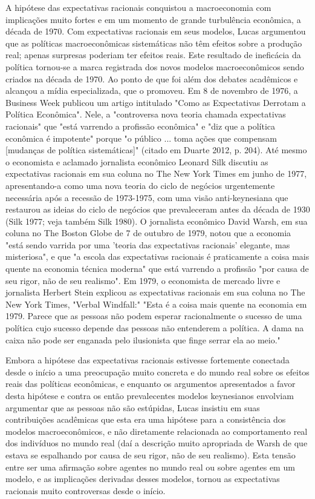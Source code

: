 \documentclass[a4paper,12pt]{article}[abntex2]
\begin{document}
A hipótese das expectativas racionais conquistou a macroeconomia com implicações muito fortes e em um momento de grande turbulência econômica, a década de 1970. Com expectativas racionais em seus modelos, Lucas argumentou que as políticas macroeconômicas sistemáticas não têm efeitos sobre a produção real; apenas surpresas poderiam ter efeitos reais. Este resultado de ineficácia da política tornou-se a marca registrada dos novos modelos macroeconômicos sendo criados na década de 1970. Ao ponto de que foi além dos debates acadêmicos e alcançou a mídia especializada, que o promoveu. Em 8 de novembro de 1976, a Business Week publicou um artigo intitulado "Como as Expectativas Derrotam a Política Econômica". Nele, a "controversa nova teoria chamada expectativas racionais" que "está varrendo a profissão econômica" e "diz que a política econômica é impotente" porque "o público ... toma ações que compensam [mudanças de política sistemáticas]" (citado em Duarte 2012, p. 204). Até mesmo o economista e aclamado jornalista econômico Leonard Silk discutiu as expectativas racionais em sua coluna no The New York Times em junho de 1977, apresentando-a como uma nova teoria do ciclo de negócios urgentemente necessária após a recessão de 1973-1975, com uma visão anti-keynesiana que restaurou as ideias do ciclo de negócios que prevaleceram antes da década de 1930 (Silk 1977; veja também Silk 1980). O jornalista econômico David Warsh, em sua coluna no The Boston Globe de 7 de outubro de 1979, notou que a economia "está sendo varrida por uma 'teoria das expectativas racionais' elegante, mas misteriosa", e que "a escola das expectativas racionais é praticamente a coisa mais quente na economia técnica moderna" que está varrendo a profissão "por causa de seu rigor, não de seu realismo". Em 1979, o economista de mercado livre e jornalista Herbert Stein explicou as expectativas racionais em sua coluna no The New York Times, "Verbal Windfall:" "Esta é a coisa mais quente na economia em 1979. Parece que as pessoas não podem esperar racionalmente o sucesso de uma política cujo sucesso depende das pessoas não entenderem a política. A dama na caixa não pode ser enganada pelo ilusionista que finge serrar ela ao meio."

Embora a hipótese das expectativas racionais estivesse fortemente conectada desde o início a uma preocupação muito concreta e do mundo real sobre os efeitos reais das políticas econômicas, e enquanto os argumentos apresentados a favor desta hipótese e contra os então prevalecentes modelos keynesianos envolviam argumentar que as pessoas não são estúpidas, Lucas insistiu em suas contribuições acadêmicas que esta era uma hipótese para a consistência dos modelos macroeconômicos, e não diretamente relacionada ao comportamento real dos indivíduos no mundo real (daí a descrição muito apropriada de Warsh de que estava se espalhando por causa de seu rigor, não de seu realismo). Esta tensão entre ser uma afirmação sobre agentes no mundo real ou sobre agentes em um modelo, e as implicações derivadas desses modelos, tornou as expectativas racionais muito controversas desde o início.
\end{document}
